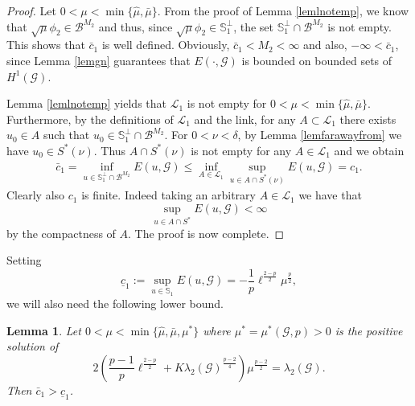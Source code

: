 \documentclass[10pt,a4paper]{article}
\newtheorem{lemma}[theorem]{Lemma}
\theoremstyle{definition} \theoremstyle{remark}
\numberwithin{equation}{section}
\newcommand{\G}{\mathcal{G}}
\newcommand{\B}{\mathcal{B}}
\newcommand{\s}{\mathbb{S}}
\newcommand{\cl}{\mathcal{L}}
\newcommand{\la}{\lambda}
\begin{document}
\begin{proof}
Let $0 < \mu < \min\{\hat{\mu},\bar{\mu}\}$. From the proof of Lemma \ref{lemlnotemp}, we know that $\sqrt{\mu}\phi_2 \in \B^{M_2}$ and thus, since $\sqrt{\mu}\phi_2 \in \s_1^\perp$, the set $\s_1^\perp \cap \B^{M_2}$ is not empty. This shows that $\bar{c}_1$ is well defined. Obviously, $\bar{c}_1 < M_2 < \infty$ and also, $ - \infty <\bar{c}_1 $, since Lemma \ref{lemgn} guarantees that $E(\cdot, \G)$ is bounded on bounded sets of $H^1(\G)$.
	
Lemma \ref{lemlnotemp} yields that $\cl_1$ is not empty for $0 < \mu < \min\{\hat{\mu},\bar{\mu}\}$. Furthermore, by the definitions of $\cl_1$ and the link, for any $A \subset \cl_1$ there exists $u_0 \in A$ such that $u_0 \in \s_1^\perp \cap \B^{M_2}$. For $0 < \nu < \delta$, by Lemma \ref{lemfarawayfrom} we have $u_0 \in S^*(\nu)$. Thus $A \cap S^*(\nu)$ is not empty for any $A \in \cl_1$ and we obtain
	\begin{align*}
		\bar{c}_1 = \inf_{u\in\s_1^\perp \cap \B^{M_2}}E(u,\G) \leq \inf_{A \in \cl_1}\sup_{u \in A\cap S^*(\nu)}E(u,\G) = c_1.
	\end{align*}
	Clearly also $c_1$ is finite. Indeed taking an arbitrary $A \in \cl_1$ we have that
	$$ \sup_{u \in A \cap S^*}E(u, \G) < \infty$$
	by the compactness of $A$. The proof is now complete.
\end{proof}

Setting 
$$\underline{c}_1 := \sup_{u \in \s_1}E(u,\G) = -\frac1p\ell^{\frac{2-p}2}\mu^{\frac p2},$$
we will also need the following lower bound.

\begin{lemma} \label{lemvaluesepe}
	Let $0 < \mu < \min\{\hat{\mu},\bar{\mu}, \mu^*\}$ where $\mu^* = \mu^*(\G,p) > 0$ is the positive solution of
	$$
	2\left( \frac{p-1}p\ell^{\frac{2-p}2} + K\la_2(\G)^{\frac{p-2}4}\right) \mu^{\frac {p-2}2} = \la_2(\G).
	$$
	Then $\bar{c}_1 > \underline{c}_1$.
\end{lemma}
\end{document}
